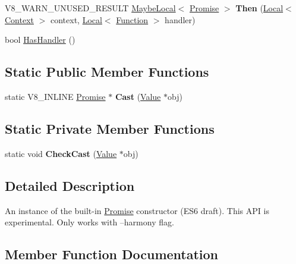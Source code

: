 \begin{DoxyCompactItemize}
\item 
V8\+\_\+\+W\+A\+R\+N\+\_\+\+U\+N\+U\+S\+E\+D\+\_\+\+R\+E\+S\+U\+LT \hyperlink{classv8_1_1_maybe_local}{Maybe\+Local}$<$ \hyperlink{classv8_1_1_promise}{Promise} $>$ {\bfseries Then} (\hyperlink{classv8_1_1_local}{Local}$<$ \hyperlink{classv8_1_1_context}{Context} $>$ context, \hyperlink{classv8_1_1_local}{Local}$<$ \hyperlink{classv8_1_1_function}{Function} $>$ handler)\hypertarget{classv8_1_1_promise_af043d82818e1bbaf6c659e40bcf86c89}{}\label{classv8_1_1_promise_af043d82818e1bbaf6c659e40bcf86c89}

\item 
bool \hyperlink{classv8_1_1_promise_aeea8bdfdbe2291632d7f0d45394c1722}{Has\+Handler} ()
\end{DoxyCompactItemize}
\subsection*{Static Public Member Functions}
\begin{DoxyCompactItemize}
\item 
static V8\+\_\+\+I\+N\+L\+I\+NE \hyperlink{classv8_1_1_promise}{Promise} $\ast$ {\bfseries Cast} (\hyperlink{classv8_1_1_value}{Value} $\ast$obj)\hypertarget{classv8_1_1_promise_adfa3b953beb2678dd3b5d6ddb3f0746d}{}\label{classv8_1_1_promise_adfa3b953beb2678dd3b5d6ddb3f0746d}

\end{DoxyCompactItemize}
\subsection*{Static Private Member Functions}
\begin{DoxyCompactItemize}
\item 
static void {\bfseries Check\+Cast} (\hyperlink{classv8_1_1_value}{Value} $\ast$obj)\hypertarget{classv8_1_1_promise_a6c6f1b9b87d6fef2db0f16fb04bb6ed1}{}\label{classv8_1_1_promise_a6c6f1b9b87d6fef2db0f16fb04bb6ed1}

\end{DoxyCompactItemize}


\subsection{Detailed Description}
An instance of the built-\/in \hyperlink{classv8_1_1_promise}{Promise} constructor (E\+S6 draft). This A\+PI is experimental. Only works with --harmony flag. 

\subsection{Member Function Documentation}
